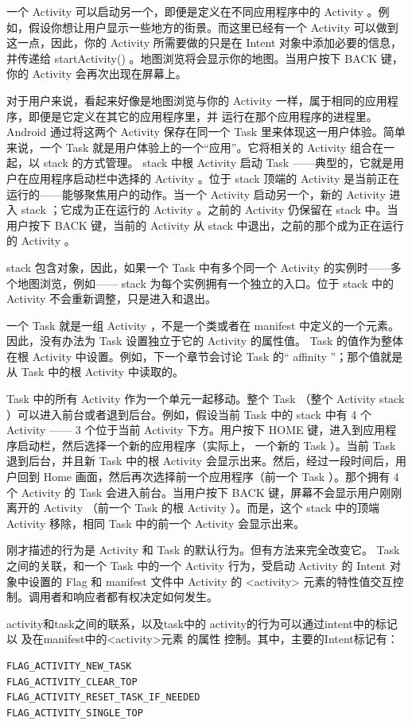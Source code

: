 \documentclass[a4paper, 11pt]{article}
\begin{document}
一个 Activity 可以启动另一个，即便是定义在不同应用程序中的 Activity 。例如，假设你想让用户显示一些地方的街景。而这里已经有一个 Activity 可以做到这一点，因此，你的 Activity 所需要做的只是在 Intent 对象中添加必要的信息，并传递给 startActivity() 。地图浏览将会显示你的地图。当用户按下 BACK 键，你的 Activity 会再次出现在屏幕上。
 
对于用户来说，看起来好像是地图浏览与你的 Activity 一样，属于相同的应用程序，即便是它定义在其它的应用程序里，并 运行在那个应用程序的进程里。 Android 通过将这两个 Activity 保存在同一个 Task 里来体现这一用户体验。简单来说，一个 Task 就是用户体验上的一个“应用”。它将相关的 Activity 组合在一起，以 stack 的方式管理。 stack 中根 Activity 启动 Task ——典型的，它就是用户在应用程序启动栏中选择的 Activity 。位于 stack 顶端的 Activity 是当前正在运行的——能够聚焦用户的动作。当一个 Activity 启动另一个，新的 Activity 进入 stack ；它成为正在运行的 Activity 。之前的 Activity 仍保留在 stack 中。当用户按下 BACK 键，当前的 Activity 从 stack 中退出，之前的那个成为正在运行的 Activity 。
 
stack 包含对象，因此，如果一个 Task 中有多个同一个 Activity 的实例时——多个地图浏览，例如—— stack 为每个实例拥有一个独立的入口。位于 stack 中的 Activity 不会重新调整，只是进入和退出。
 
一个 Task 就是一组 Activity ，不是一个类或者在 manifest 中定义的一个元素。因此，没有办法为 Task 设置独立于它的 Activity 的属性值。 Task 的值作为整体在根 Activity 中设置。例如，下一个章节会讨论 Task 的“ affinity ”；那个值就是从 Task 中的根 Activity 中读取的。
 
Task 中的所有 Activity 作为一个单元一起移动。整个 Task （整个 Activity stack ）可以进入前台或者退到后台。例如，假设当前 Task 中的 stack 中有 4 个 Activity —— 3 个位于当前 Activity 下方。用户按下 HOME 键，进入到应用程序启动栏，然后选择一个新的应用程序（实际上， 一个新的 Task ）。当前 Task 退到后台，并且新 Task 中的根 Activity 会显示出来。然后，经过一段时间后，用户回到 Home 画面，然后再次选择前一个应用程序（前一个 Task ）。那个拥有 4 个 Activity 的 Task 会进入前台。当用户按下 BACK 键，屏幕不会显示用户刚刚离开的 Activity （前一个 Task 的根 Activity ）。而是，这个 stack 中的顶端 Activity 移除，相同 Task 中的前一个 Activity 会显示出来。
 
刚才描述的行为是 Activity 和 Task 的默认行为。但有方法来完全改变它。 Task 之间的关联，和一个 Task 中的一个 Activity 行为，受启动 Activity 的 Intent 对象中设置的 Flag 和 manifest 文件中 Activity 的 <activity> 元素的特性值交互控制。调用者和响应者都有权决定如何发生。

activity和task之间的联系，以及task中的 activity的行为可以通过intent中的标记 以 及在manifest中的<activity>元素 的属性 控制。其中，主要的Intent标记有：
\begin{verbatim}
FLAG_ACTIVITY_NEW_TASK
FLAG_ACTIVITY_CLEAR_TOP
FLAG_ACTIVITY_RESET_TASK_IF_NEEDED
FLAG_ACTIVITY_SINGLE_TOP
\end{verbatim}
\end{document}
